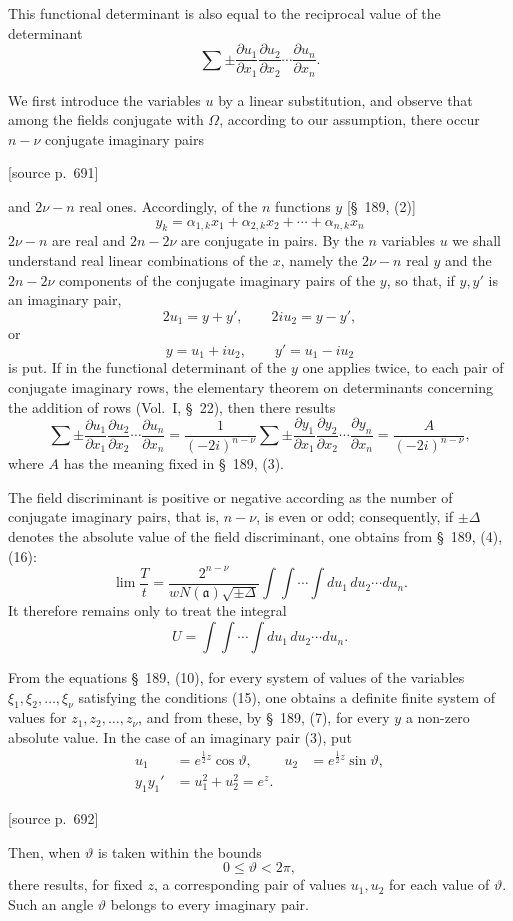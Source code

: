 \documentclass[11pt]{article}
\newcommand{\srcpage}[1]{\par\medskip\noindent\textsf{[source p.~#1]}\par\smallskip}
\begin{document}
This functional determinant is also equal to the reciprocal value of the determinant
\[
\sum\pm
\frac{\partial u_1}{\partial x_1}
\frac{\partial u_2}{\partial x_2}\cdots
\frac{\partial u_n}{\partial x_n}.
\]

We first introduce the variables $u$ by a linear substitution, and observe that among the fields conjugate with $\Omega$, according to our assumption, there occur $n-\nu$ conjugate imaginary pairs

\srcpage{691}
and $2\nu-n$ real ones. Accordingly, of the $n$ functions $y$ [\S~189, (2)]
\begin{equation}
y_k=\alpha_{1,k}x_1+\alpha_{2,k}x_2+\cdots+\alpha_{n,k}x_n
\tag{2}
\end{equation}
$2\nu-n$ are real and $2n-2\nu$ are conjugate in pairs. By the $n$ variables $u$ we shall understand real linear combinations of the $x$, namely the $2\nu-n$ real $y$ and the $2n-2\nu$ components of the conjugate imaginary pairs of the $y$, so that, if $y,y'$ is an imaginary pair,
\[
2u_1=y+y',\qquad 2iu_2=y-y',
\]
or
\begin{equation}
y=u_1+iu_2,
\qquad y'=u_1-iu_2
\tag{3}
\end{equation}
is put. If in the functional determinant of the $y$ one applies twice, to each pair of conjugate imaginary rows, the elementary theorem on determinants concerning the addition of rows (Vol.~I, \S~22), then there results
\[
\sum\pm
\frac{\partial u_1}{\partial x_1}
\frac{\partial u_2}{\partial x_2}\cdots
\frac{\partial u_n}{\partial x_n}
=
\frac1{(-2i)^{n-\nu}}
\sum\pm
\frac{\partial y_1}{\partial x_1}
\frac{\partial y_2}{\partial x_2}\cdots
\frac{\partial y_n}{\partial x_n}
=
\frac{A}{(-2i)^{n-\nu}},
\]
where $A$ has the meaning fixed in \S~189, (3).

The field discriminant is positive or negative according as the number of conjugate imaginary pairs, that is, $n-\nu$, is even or odd; consequently, if $\pm\Delta$ denotes the absolute value of the field discriminant, one obtains from \S~189, (4), (16):
\begin{equation}
\lim\frac{T}{t}
=
\frac{2^{n-\nu}}{wN(\mathfrak a)\sqrt{\pm\Delta}}
\int\!\int\cdots\int du_1\,du_2\cdots du_n.
\tag{4}
\end{equation}
It therefore remains only to treat the integral
\[
U=\int\!\int\cdots\int du_1\,du_2\cdots du_n.
\]

From the equations \S~189, (10), for every system of values of the variables $\xi_1,\xi_2,\ldots,\xi_\nu$ satisfying the conditions (15), one obtains a definite finite system of values for $z_1,z_2,\ldots,z_\nu$, and from these, by \S~189, (7), for every $y$ a non-zero absolute value. In the case of an imaginary pair (3), put
\begin{align}
u_1&=e^{\frac12 z}\cos\vartheta,
&u_2&=e^{\frac12 z}\sin\vartheta,
\tag{5}\\
y_1y_1'&=u_1^2+u_2^2=e^z.
\tag{6}
\end{align}
\srcpage{692}
Then, when $\vartheta$ is taken within the bounds
\[
0\leq\vartheta<2\pi,
\]
there results, for fixed $z$, a corresponding pair of values $u_1,u_2$ for each value of $\vartheta$. Such an angle $\vartheta$ belongs to every imaginary pair.
\end{document}
